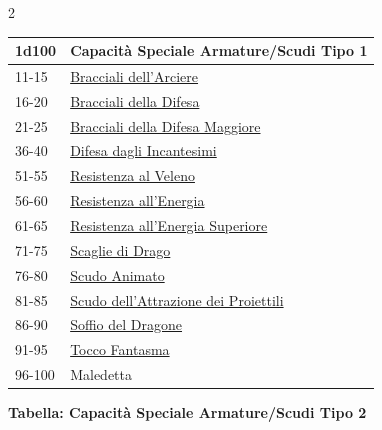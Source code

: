 \begin{multicols}{2}
{\medskip

{\small\begin{tabularx}{\linewidth}{ll}
		\toprule
\rowcolor{gray!20}\textbf{1d100} & \textbf{Capacità Speciale Armature/Scudi Tipo 1}\\
\toprule
11-15& \hyperlink{Bracciali dell'Arciere}{Bracciali dell'Arciere}\\
\rowcolor{gray!20}16-20& \hyperlink{Bracciali della Difesa}{Bracciali della Difesa}\\
21-25& \hyperlink{Bracciali della Difesa Maggiore}{Bracciali della Difesa Maggiore}\\
\rowcolor{gray!20}36-40& \hyperlink{Difesa dagli Incantesimi}{Difesa dagli Incantesimi}\\
51-55& \hyperlink{Resistenza al Veleno}{Resistenza al Veleno}\\
\rowcolor{gray!20}56-60& \hyperlink{Resistenza all'Energia}{Resistenza all'Energia}\\
61-65& \hyperlink{Resistenza all'Energia Superiore}{Resistenza all'Energia Superiore}\\
\rowcolor{gray!20}71-75& \hyperlink{Scaglie di Drago}{Scaglie di Drago}\\
76-80& \hyperlink{Scudo Animato}{Scudo Animato}\\
\rowcolor{gray!20}81-85& \hyperlink{Scudo dell'Attrazione dei Proiettili}{Scudo dell'Attrazione dei Proiettili}\\
86-90& \hyperlink{Soffio del Dragone}{Soffio del Dragone}\\
\rowcolor{gray!20}91-95& \hyperlink{Tocco Fantasma}{Tocco Fantasma}\\
96-100 & Maledetta\\
\end{tabularx}}


\textbf{Tabella: Capacità Speciale Armature/Scudi Tipo 2}\hypertarget{Capacità Speciale Armature / Scudi Tipo 2}{}

\medskip

}
\end{multicols}
